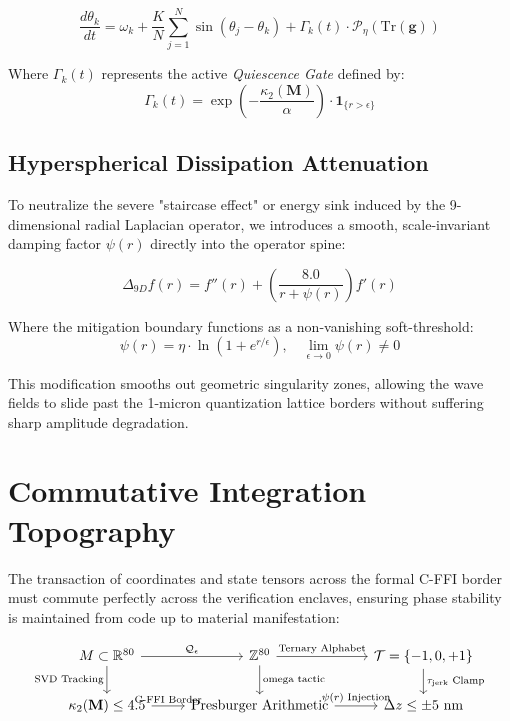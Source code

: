 \documentclass[11pt,nofilelist]{article}
\begin{document}
\begin{equation}
\frac{d\theta_k}{dt} = \omega_k + \frac{K}{N} \sum_{j=1}^{N} \sin(\theta_j - \theta_k) + \Gamma_k(t) \cdot \mathcal{P}_{\eta}\left( \text{Tr}(\mathbf{g}) \right)
\end{equation}

Where $\Gamma_k(t)$ represents the active \textit{Quiescence Gate} defined by:
\begin{equation}
\Gamma_k(t) = \exp\left( -\frac{\kappa_2(\mathbf{M})}{\alpha} \right) \cdot \mathbf{1}_{\{r > \epsilon\}}
\end{equation}

\subsection{Hyperspherical Dissipation Attenuation}
To neutralize the severe "staircase effect" or energy sink induced by the 9-dimensional radial Laplacian operator, we introduces a smooth, scale-invariant damping factor $\psi(r)$ directly into the operator spine:

\begin{equation}
\Delta_{9D} f(r) = f''(r) + \left( \frac{8.0}{r + \psi(r)} \right) f'(r)
\end{equation}

Where the mitigation boundary functions as a non-vanishing soft-threshold:
\begin{equation}
\psi(r) = \eta \cdot \ln\left( 1 + e^{r/\epsilon} \right), \quad \lim_{\epsilon \to 0} \psi(r) \neq 0
\end{equation}

This modification smooths out geometric singularity zones, allowing the wave fields to slide past the 1-micron quantization lattice borders without suffering sharp amplitude degradation.

\section{Commutative Integration Topography}
The transaction of coordinates and state tensors across the formal C-FFI border must commute perfectly across the verification enclaves, ensuring phase stability is maintained from code up to material manifestation:

\[
\begin{tikzcd}
M \subset \mathbb{R}^{80} \arrow[r, "\mathcal{Q}_{\epsilon}"] \arrow[d, "\text{SVD Tracking}"'] & \mathbb{Z}^{80} \arrow[d, "\text{omega tactic}"] \arrow[r, "\text{Ternary Alphabet}"] & \mathcal{T} = \{-1, 0, +1\} \arrow[d, "\tau_{\text{jerk}} \text{ Clamp}"] \\
\kappa_2(\mathbf{M}) \le 4.5 \arrow[r, "\text{C-FFI Border}"] & \text{Presburger Arithmetic} \arrow[r, "\psi(r) \text{ Injection}"] & \Delta z \le \pm 5\text{ nm}
\end{tikzcd}
\]
\end{document}
